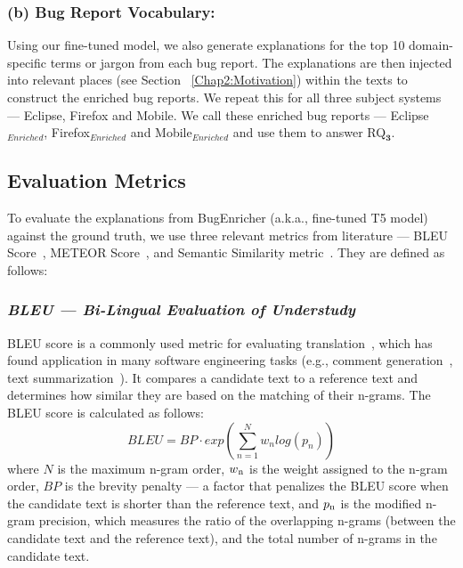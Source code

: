 \subsubsection{(b) Bug Report Vocabulary:}
Using our fine-tuned model, we also generate explanations for the top 10 domain-specific terms or jargon from each bug report. The explanations are then injected into relevant places (see Section ~\ref{Chap2:Motivation}) within the texts to construct the enriched bug reports. We repeat this for all three subject systems --- Eclipse, Firefox and Mobile. We call these enriched bug reports --- Eclipse$_{Enriched}$, Firefox$_{Enriched}$ and Mobile$_{Enriched}$ and use them to answer RQ$\mathbf{_3}$. 

\subsection{Evaluation Metrics}
To evaluate the explanations from BugEnricher (a.k.a., fine-tuned T5 model) against the ground truth, we use three relevant metrics from literature --- BLEU Score~\cite{papineni2002bleu}, METEOR Score~\cite{banerjee2005meteor}, and Semantic Similarity metric~\cite{haque2022semantic}. They are defined as follows:

\subsubsection{\emph{\textit{BLEU --- Bi-Lingual Evaluation of Understudy} }}
BLEU score is a commonly used metric for evaluating translation~\cite{papineni2002bleu}, which has found application in many software engineering tasks (e.g., comment generation~\cite{hu2018deep}, text summarization~\cite{shi2022evaluation}). It compares a candidate text to a reference text and determines how similar they are based on the matching of their n-grams. The BLEU score is calculated as follows:
\begin{equation}
BLEU = BP \cdot exp \left ( \sum_{n=1}^{N}w_{n}log(p_{n}) \right )
\end{equation}
where $N$ is the maximum n-gram order, $w\textsubscript{n}$ is the weight assigned to the n-gram order, $BP$ is the brevity penalty --- a factor that penalizes the BLEU score when the candidate text is shorter than the reference text, and $p\textsubscript{n}$ is the modified n-gram precision, which measures the ratio of the overlapping n-grams (between the candidate text and the reference text), and the total number of n-grams in the candidate text.

